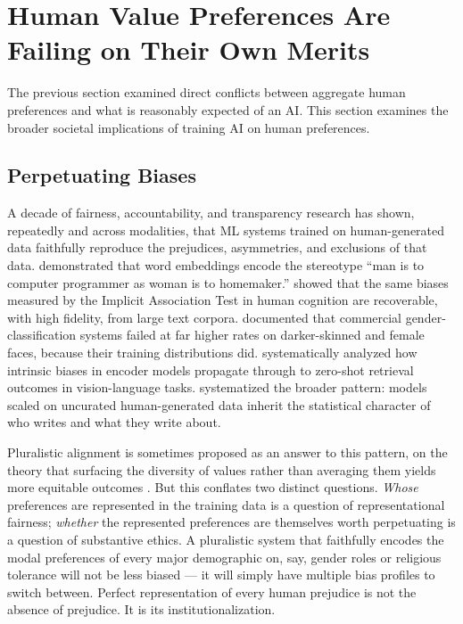 \documentclass{article}
\theoremstyle{plain}
\theoremstyle{definition}
\theoremstyle{remark}
\begin{document}
\section{Human Value Preferences Are Failing on Their Own Merits}
\label{sec:failing}

The previous section examined direct conflicts between aggregate human preferences and what is reasonably expected of an AI. This section examines the broader societal implications of training AI on human preferences.

\subsection{Perpetuating Biases}
\label{sec:bias}
A decade of fairness, accountability, and transparency research has shown, repeatedly and across modalities, that ML systems trained on human-generated data faithfully reproduce the prejudices, asymmetries, and exclusions of that data. \citet{bolukbasi2016man} demonstrated that word embeddings encode the stereotype ``man is to computer programmer as woman is to homemaker.'' \citet{caliskan2017semantics} showed that the same biases measured by the Implicit Association Test in human cognition are recoverable, with high fidelity, from large text corpora. \citet{buolamwini2018gender} documented that commercial gender-classification systems failed at far higher rates on darker-skinned and female faces, because their training distributions did. \citet{ghate-etal-2025-biases} systematically analyzed how intrinsic biases in encoder models propagate through to zero-shot retrieval outcomes in vision-language tasks. \citet{bender2021stochastic} systematized the broader pattern: models scaled on uncurated human-generated data inherit the statistical character of who writes and what they write about.

Pluralistic alignment is sometimes proposed as an answer to this pattern, on the theory that surfacing the diversity of values rather than averaging them yields more equitable outcomes \citep{sorensen2024roadmap}. But this conflates two distinct questions. \emph{Whose} preferences are represented in the training data is a question of representational fairness; \emph{whether} the represented preferences are themselves worth perpetuating is a question of substantive ethics. A pluralistic system that faithfully encodes the modal preferences of every major demographic on, say, gender roles or religious tolerance will not be less biased --- it will simply have multiple bias profiles to switch between. Perfect representation of every human prejudice is not the absence of prejudice. It is its institutionalization.
\end{document}
